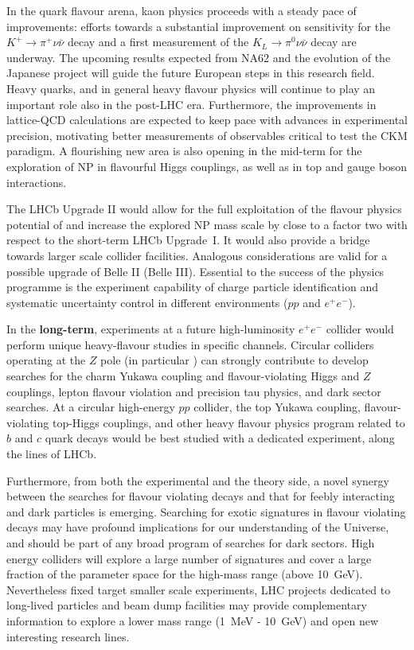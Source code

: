 In the quark flavour arena, kaon physics proceeds with a steady pace of improvements: efforts towards a substantial improvement on sensitivity for the $K^+ \to \pi^+ \nu \bar \nu$ decay 
and a first measurement of the $K_L \to \pi^0 \nu \bar \nu$ decay are underway.  The upcoming results expected from NA62 and the evolution of the Japanese project will guide the future European steps in this research field. 
Heavy quarks, and in general heavy flavour physics will continue to play an important role also in the post-LHC era. Furthermore, the improvements in lattice-QCD calculations are expected to keep pace with advances in  experimental precision,  
 motivating better measurements of observables critical to test the CKM paradigm.  A flourishing new area is also opening in the mid-term for the exploration of NP in flavourful Higgs couplings, as well as in top and gauge boson interactions. 

The LHCb Upgrade II would allow 
 for the full exploitation of the flavour physics potential of \HLLHC  and increase the explored NP mass scale by close to a factor two with respect to the short-term LHCb Upgrade~I.
It would also provide a bridge towards larger scale collider facilities.
Analogous considerations are valid for a possible upgrade of Belle II (Belle III).
Essential to the success of the physics programme is the experiment capability of charge particle identification and systematic uncertainty control
in different  environments 
($pp$  and $e^+e^-$).


In the \textbf{long-term}, experiments at a future high-luminosity $e^+e^-$ collider 
would perform unique heavy-flavour studies 
in specific channels. 
Circular colliders operating at the $Z$  
pole (in particular \FCCee) 
can strongly contribute to develop searches for  the charm Yukawa coupling and flavour-violating Higgs and $Z$ couplings, lepton flavour violation and precision tau physics, and dark sector searches.   
At a circular high-energy $pp$ collider, the top Yukawa coupling, flavour-violating top-Higgs couplings,  and other heavy flavour physics program related to $b$ and $c$ quark decays would be best studied with a dedicated experiment, along the lines of LHCb.



Furthermore,  from both the experimental and the theory side, a novel synergy  between the searches for flavour violating decays and that  for feebly interacting and dark particles is emerging. Searching for exotic signatures in flavour violating decays  
may have profound implications for our understanding of the Universe, and should be part of any broad program of searches for dark sectors. 
 High energy colliders will explore a large number of signatures and cover a large fraction of the parameter space for the high-mass range (above 10~GeV). 
Nevertheless fixed target smaller scale experiments, LHC projects dedicated
to long-lived particles and beam dump facilities may provide complementary information to explore a lower mass range  
(1~MeV - 10~GeV) and open new interesting research lines. 

